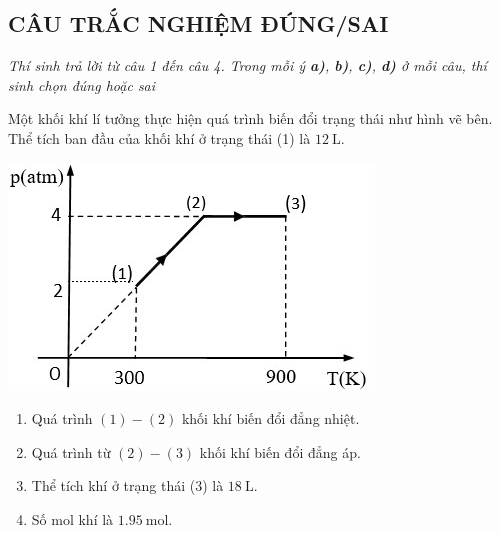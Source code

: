 \subsection{CÂU TRẮC NGHIỆM ĐÚNG/SAI}
\textit{Thí sinh trả lời từ câu 1 đến câu 4. Trong mỗi ý \textbf{a)}, \textbf{b)}, \textbf{c)}, \textbf{d)} ở mỗi câu, thí sinh chọn đúng hoặc sai}
\setcounter{ex}{0}
\begin{ex}
	Một khối khí lí tưởng thực hiện quá trình biến đổi trạng thái như hình vẽ bên. Thể tích ban đầu của khối khí ở trạng thái (1) là $\SI{12}{\liter}$.
	\begin{center}
		\includegraphics[width=0.45\linewidth]{figs/VN12-Y24-PH-SYL-016-2}
	\end{center}
	\begin{enumerate}[label=\alph*)]
		\item Quá trình $(1) - (2)$ khối khí biến đổi đẳng nhiệt.
		\item Quá trình từ $(2) - (3)$ khối khí biến đổi đẳng áp.
		\item Thể tích khí ở trạng thái (3) là $\SI{18}{\liter}$.
		\item Số mol khí là $\SI{1.95}{\mole}$.
	\end{enumerate}
\end{ex}
